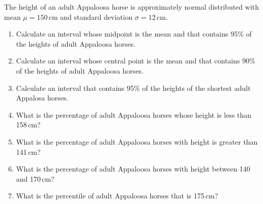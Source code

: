 \begin{problem}
  The height  of an adult Appaloosa horse is approximately normal
  distributed with mean $\mu=150$\,cm and standard deviation
  $\sigma=12$\,cm.
  \begin{enumerate} \renewcommand{\theenumi}{\roman{enumi}}
  \item Calculate an interval whose midpoint is the mean and that
    contains 95\% of the heights of adult  Appaloosa horses. 
 \item Calculate an interval  whose central point is the mean and that
    contains 90\% of the heights of adult  Appaloosa horses. 
 \item Calculate an interval  that
    contains 95\% of the heights of the shortest adult  Appalosa horses. 
 \item What is the percentage of adult  Appaloosa horses whose height is less than
   158\,cm?
 \item What  is the percentage of adult  Appaloosa horses with height is greater than
   141\,cm?
  \item What  is the percentage of adult  Appaloosa horses with height between 140
    and 170\,cm?
\item What is the percentile of adult  Appaloosa horses that is 
  175\,cm? 
  \end{enumerate}
\end{problem}